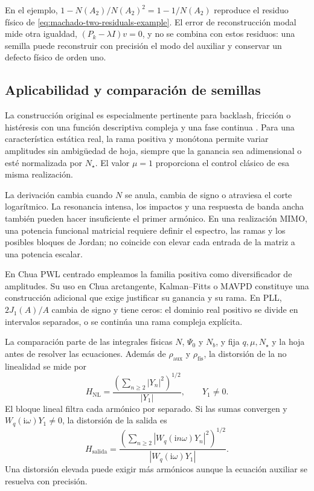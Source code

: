 En el ejemplo, \(1-N(A_2)/N(A_2)^2=1-1/N(A_2)\) reproduce el
residuo físico de \cref{eq:machado-two-residuals-example}. El error de
reconstrucción modal mide otra igualdad, \((P_k-\lambda I)v=0\), y
no se combina con estos residuos: una semilla puede reconstruir con precisión
el modo del auxiliar y conservar un defecto físico de orden uno.

\subsection{Aplicabilidad y comparación de semillas}

La construcción original es especialmente pertinente para backlash, fricción
o histéresis con una función descriptiva compleja y una fase continua
\cite{DuarteMachado2009Coulomb,Machado2015FDF}. Para una característica
estática real, la rama positiva y monótona permite variar amplitudes sin
ambigüedad de hoja, siempre que la ganancia sea adimensional o esté
normalizada por \(N_\star\). El valor \(\mu=1\) proporciona el control
clásico de esa misma realización.

La derivación cambia cuando \(N\) se anula, cambia de signo o atraviesa el
corte logarítmico. La resonancia intensa, los impactos y una respuesta de
banda ancha también pueden hacer insuficiente el primer armónico. En una
realización MIMO, una potencia funcional matricial requiere definir el
espectro, las ramas y los posibles bloques de Jordan; no coincide con elevar
cada entrada de la matriz a una potencia escalar.

En Chua PWL centrado empleamos la familia positiva como diversificador de
amplitudes. Su uso en Chua arctangente, Kalman--Fitts o MAVPD constituye una
construcción adicional que exige justificar su ganancia y su rama. En PLL,
\(2J_1(A)/A\) cambia de signo y tiene ceros: el dominio real positivo se
divide en intervalos separados, o se continúa una rama compleja explícita.

La comparación parte de las integrales físicas \(N\), \(\Psi_0\) y
\(N_b\), y fija \(q,\mu,N_\star\) y la hoja antes de resolver las
ecuaciones. Además de \(\rho_{\mathrm{aux}}\) y
\(\rho_{\mathrm{fis}}\), la distorsión de la no linealidad se mide por
\[
 H_{\mathrm{NL}}=
 \frac{(\sum_{n\ge2}|Y_n|^2)^{1/2}}{|Y_1|},\qquad Y_1\ne0.
\]
El bloque lineal filtra cada armónico por separado. Si las sumas convergen y
\(W_q(\mathrm i\omega)Y_1\ne0\), la distorsión de la salida es
\begin{equation}
 H_{\mathrm{salida}}=
 \frac{\left(\sum_{n\ge2}|W_q(\mathrm in\omega)Y_n|^2\right)^{1/2}}
 {|W_q(\mathrm i\omega)Y_1|}.
 \label{eq:machado-distorsion-salida-filtrada}
\end{equation}
Una distorsión elevada puede exigir más armónicos aunque la ecuación auxiliar
se resuelva con precisión.

